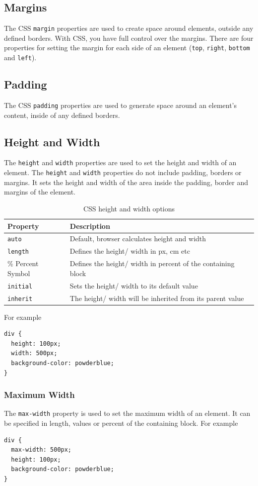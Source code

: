\documentclass{thomasClass}
\begin{document}
\subsection{Margins}
The CSS \verb|margin| properties are used to create space around elements, outside any defined borders. With CSS, you have full control over the margins. There are four properties for setting the margin for each side of an element (\verb|top|, \verb|right|, \verb|bottom| and \verb|left|). 
\subsection{Padding}
The CSS \verb|padding| properties are used to generate space around an element's content, inside of any defined borders.
\subsection{Height and Width}
The \verb|height| and \verb|width| properties are used to set the height and width of an element. The \verb|height| and \verb|width| properties do not include padding, borders or margins. It sets the height and width of the area inside the padding, border and margins of the element.
\begin{table}[H]
    \centering
    \begin{tabularx}{0.5\textwidth}{X|X}
        Property & Description\\
        \hline
        \verb|auto| & Default, browser calculates height and width \\
        \verb|length| & Defines the height/ width in px, cm etc\\
        \% Percent Symbol & Defines the height/ width in percent of the containing block\\
        \verb|initial| & Sets the height/ width to its default value\\
        \verb|inherit| & The height/ width will be inherited from its parent value
    \end{tabularx}
    \caption{CSS height and width options}
    \label{tab:cssHeightWidth}
\end{table}
For example
\begin{Verbatim}[breaklines=true, breakanywhere=true]
div {
  height: 100px;
  width: 500px;
  background-color: powderblue;
}
\end{Verbatim}
\subsubsection{Maximum Width}
The \verb|max-width| property is used to set the maximum width of an element. It can be specified in length, values or percent of the containing block. For example
\begin{Verbatim}[breaklines=true, breakanywhere=true]
div {
  max-width: 500px;
  height: 100px;
  background-color: powderblue;
}
\end{Verbatim}
\end{document}
